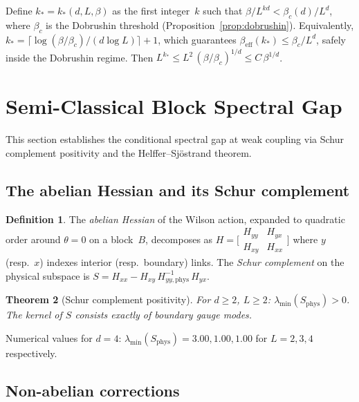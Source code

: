 \documentclass[11pt,a4paper]{article}
\theoremstyle{plain}
\newtheorem{theorem}{Theorem}[section]
\theoremstyle{definition}
\newtheorem{definition}[theorem]{Definition}
\theoremstyle{remark}
\begin{document}
Define $k_* = k_*(d, L, \beta)$ as the first integer~$k$
such that $\beta / L^{kd} < \beta_c(d)/L^d$, where $\beta_c$
is the Dobrushin threshold (Proposition~\ref{prop:dobrushin}).
Equivalently,
$k_* = \lceil \log(\beta/\beta_c) / (d\log L) \rceil + 1$,
which guarantees $\beta_{\mathrm{eff}}(k_*) \leq \beta_c / L^d$,
safely inside the Dobrushin regime.
Then $L^{k_*} \leq L^2\,(\beta/\beta_c)^{1/d}
\leq C\,\beta^{1/d}$.


\section{Semi-Classical Block Spectral Gap}\label{sec:semiclassical}

This section establishes the conditional spectral gap
at weak coupling via Schur complement positivity and the
Helffer--Sj\"ostrand theorem.

\subsection{The abelian Hessian and its Schur complement}

\begin{definition}
The \emph{abelian Hessian} of the Wilson action, expanded
to quadratic order around $\theta = 0$ on a block~$B$,
decomposes as
$H = \bigl[\begin{smallmatrix}
H_{yy} & H_{yx} \\ H_{xy} & H_{xx}
\end{smallmatrix}\bigr]$
where $y$ (resp.\ $x$) indexes interior (resp.\ boundary) links.
The \emph{Schur complement} on the physical subspace is
$S = H_{xx} - H_{xy}\,H_{yy,\mathrm{phys}}^{-1}\,H_{yx}$.
\end{definition}

\begin{theorem}[Schur complement positivity]
\label{thm:schur}
For $d \geq 2$, $L \geq 2$:
$\lambda_{\min}(S_{\mathrm{phys}}) > 0$.
The kernel of $S$ consists exactly of boundary gauge modes.
\end{theorem}

\noindent Numerical values for $d = 4$:
$\lambda_{\min}(S_{\mathrm{phys}}) = 3.00, 1.00, 1.00$
for $L = 2, 3, 4$ respectively.

\subsection{Non-abelian corrections}
\end{document}
